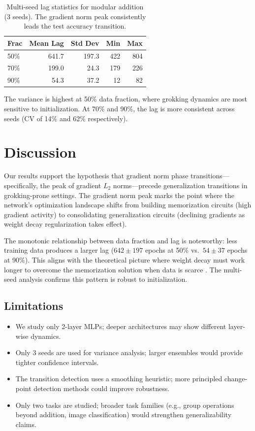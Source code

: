 \documentclass[11pt,a4paper]{article}
\begin{document}
\begin{table}[h]
\centering
\caption{Multi-seed lag statistics for modular addition (3 seeds). The gradient norm peak consistently leads the test accuracy transition.}
\label{tab:variance}
\begin{tabular}{lrrrr}
\toprule
Frac & Mean Lag & Std Dev & Min & Max \\
\midrule
50\% & 641.7 & 197.3 & 422 & 804 \\
70\% & 199.0 & 24.3 & 179 & 226 \\
90\% & 54.3 & 37.2 & 12 & 82 \\
\bottomrule
\end{tabular}
\end{table}

The variance is highest at 50\% data fraction, where grokking dynamics are most sensitive to initialization. At 70\% and 90\%, the lag is more consistent across seeds (CV of 14\% and 62\% respectively).

\section{Discussion}

Our results support the hypothesis that gradient norm phase transitions---specifically, the peak of gradient $L_2$ norms---precede generalization transitions in grokking-prone settings. The gradient norm peak marks the point where the network's optimization landscape shifts from building memorization circuits (high gradient activity) to consolidating generalization circuits (declining gradients as weight decay regularization takes effect).

The monotonic relationship between data fraction and lag is noteworthy: less training data produces a larger lag ($642 \pm 197$ epochs at 50\% vs.\ $54 \pm 37$ epochs at 90\%). This aligns with the theoretical picture where weight decay must work longer to overcome the memorization solution when data is scarce \citep{liu2022omnigrok}. The multi-seed analysis confirms this pattern is robust to initialization.

\subsection{Limitations}

\begin{itemize}
    \item We study only 2-layer MLPs; deeper architectures may show different layer-wise dynamics.
    \item Only 3 seeds are used for variance analysis; larger ensembles would provide tighter confidence intervals.
    \item The transition detection uses a smoothing heuristic; more principled change-point detection methods could improve robustness.
    \item Only two tasks are studied; broader task families (e.g., group operations beyond addition, image classification) would strengthen generalizability claims.
\end{itemize}
\end{document}
